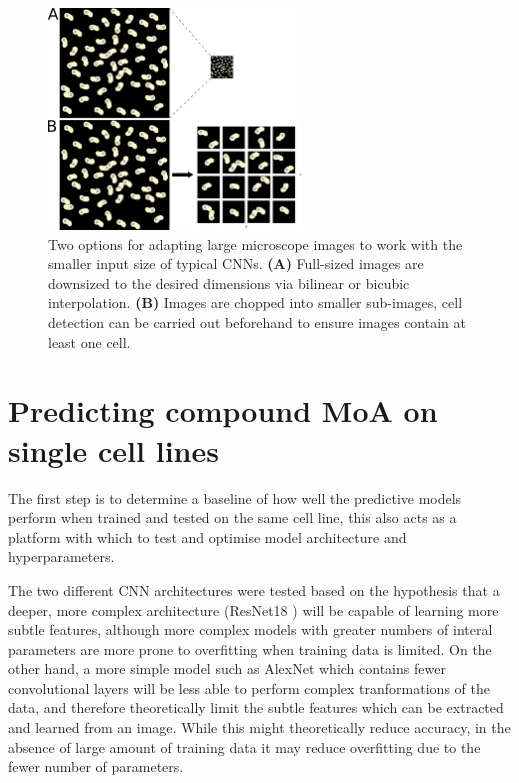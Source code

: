 \documentclass[a4paper,11pt,twoside,openright]{scrbook}
\begin{document}
\begin{figure}
    \includegraphics[width=0.6\textwidth]{ch2ImageChopping}
    \captionsetup{width=0.8\textwidth}
    \caption[Down-sizing and chopping images for CNN training]{Two options for adapting large microscope images to work with the smaller input size of typical CNNs. \textbf{(A)} Full-sized images are downsized to the desired dimensions via bilinear or bicubic interpolation. \textbf{(B)} Images are chopped into smaller sub-images, cell detection can be carried out beforehand to ensure images contain at least one cell.}
    \label{figure:image_chopping}
\end{figure}


\section{Predicting compound MoA on single cell lines}
The first step is to determine a baseline of how well the predictive models perform when trained and tested on the same cell line, this also acts as a platform with which to test and optimise model architecture and hyperparameters.


The two different CNN architectures were tested based on the hypothesis that a deeper, more complex architecture (ResNet18 \cite{He2015}) will be capable of learning more subtle features, although more complex models with greater numbers of interal parameters are more prone to overfitting when training data is limited.
On the other hand, a more simple model such as AlexNet \cite{Krizhevsky2012} which contains fewer convolutional layers will be less able to perform complex tranformations of the data, and therefore theoretically limit the subtle features which can be extracted and learned from an image.
While this might theoretically reduce accuracy, in the absence of large amount of training data it may reduce overfitting due to the fewer number of parameters.
\end{document}
